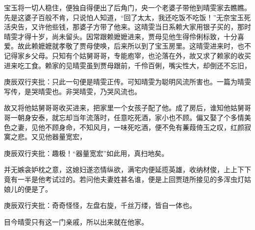 \begin{parag}


    宝玉将一切人稳住，便独自得便出了后角门，央一个老婆子带他到晴雯家去瞧瞧。先是这婆子百般不肯，只说怕人知道，“回了太太，我还吃饭不吃饭！”无奈宝玉死活央告，又许他些钱，那婆子方带了他来。这晴雯当日系赖大家用银子买的，那时晴雯才得十岁，尚未留头。因常跟赖嬷嬷进来，贾母见他生得伶俐标致，十分喜爱。故此赖嬷嬷就孝敬了贾母使唤，后来所以到了宝玉房里。这晴雯进来时，也不记得家乡父母。只知有个姑舅哥哥，专能庖宰，也沦落在外，故又求了赖家的收买进来吃工食。赖家的见晴雯虽到贾母跟前，千伶百俐，嘴尖性大，却倒还不忘旧，\begin{note}庚辰双行夹批：只此一句便是晴雯正传。可知晴雯为聪明风流所害也。一篇为晴雯写传，是哭晴雯也。非哭晴雯，乃哭风流也。\end{note}故又将他姑舅哥哥收买进来，把家里一个女孩子配了他。成了房后，谁知他姑舅哥哥一朝身安泰，就忘却当年流落时，任意吃死酒，家小也不顾。偏又娶了个多情美色之妻，见他不顾身命，不知风月，一味死吃酒，便不免有蒹葭倚玉之叹，红颜寂寞之悲。又见他器量宽宏，\begin{note}庚辰双行夹批：趣极！“器量宽宏”如此用，真扫地矣。\end{note}并无嫉衾妒枕之意，这媳妇遂恣情纵欲，满宅内便延揽英雄，收纳材俊，上上下下竟有一半是他考试过的。若问他夫妻姓甚名谁，便是上回贾琏所接见的多浑虫灯姑娘儿的便是了。\begin{note}庚辰双行夹批：奇奇怪怪，左盘右旋，千丝万缕，皆自一体也。\end{note}目今晴雯只有这一门亲戚，所以出来就在他家。
\end{parag}



